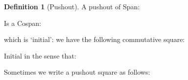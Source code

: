\documentclass{article}
\theoremstyle{definition}
\newtheorem*{definition}{Definition}
\begin{document}
    \begin{definition}
        [Pushout] A pushout of Span:

        \begin{center}
        \end{center}

        Is a Cospan:

        \begin{center}
        \end{center}

        which is `initial': we have the following commutative square:

        \begin{center}
        \end{center}
        

        Initial in the sense that:

        \begin{center}
        \end{center}

        Sometimes we write a pushout square as follows:

        \begin{center}
        \end{center}

    \end{definition}
\end{document}
